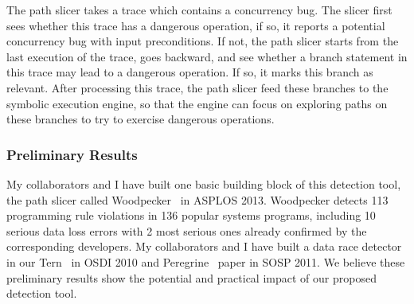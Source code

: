 The path slicer takes a trace which contains a concurrency bug. The slicer 
first sees whether this trace has a dangerous operation, if so, it reports a 
potential concurrency bug with input preconditions. If not, the path slicer 
starts from the last execution of the trace, goes backward, and see whether a 
branch statement in this trace may lead to a dangerous operation. If so, it 
marks this branch as relevant. After processing this trace, the path slicer 
feed these branches to the symbolic execution engine, so that the engine can 
focus on exploring paths on these branches to try to exercise dangerous 
operations.





 

\vspace{-.15in}\subsubsection{Preliminary Results}
\label{sec:detect-result}\vspace{-.075in}

My collaborators and I have built one basic building block of this detection 
tool, the path slicer called Woodpecker~\cite{woodpecker:asplos13} in ASPLOS 
2013. Woodpecker detects 113 programming rule violations in 136 popular systems 
programs, including 10 serious data loss errors with 2 most serious ones 
already confirmed by the corresponding developers. My collaborators and I have 
built a data race detector in our Tern~\cite{cui:tern:osdi10} in OSDI 2010 and 
Peregrine~\cite{peregrine:sosp11} paper in SOSP 2011. We believe these 
preliminary results show the potential and practical impact of our proposed 
detection tool.

